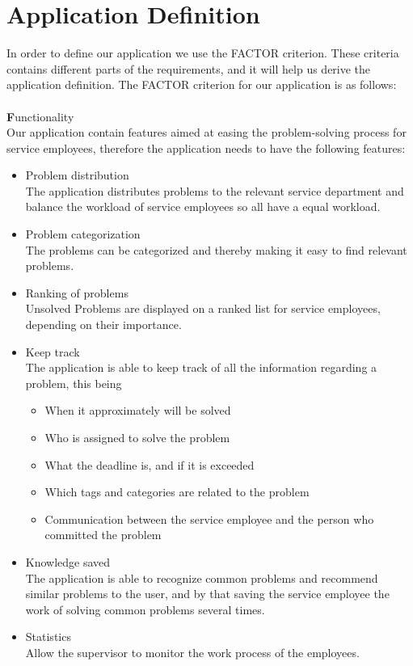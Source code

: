 \section{Application Definition}
\label{sec:factor}
\label{sec:systemdefinition}
In order to define our application we use the FACTOR criterion. \cite[p.~39]{roedeaalborg} These criteria contains different parts of the requirements, and it will help us derive the application definition.
The FACTOR criterion for our application is as follows: \\
\ \\
{\Large \textbf{F}}unctionality \\
Our application contain features aimed at easing the problem-solving process for service employees, therefore the application needs to have the following features:
\begin{itemize}
\item Problem distribution\\
The application distributes problems to the relevant service department and balance the workload of service employees so all have a equal workload. 
\item Problem categorization \\
The problems can be categorized and thereby making it easy to find relevant problems.
\item Ranking of problems \\
Unsolved Problems are displayed on a ranked list for service employees, depending on their importance.
\item Keep track \\
The application is able to keep track of all the information regarding a problem, this being
\begin{itemize}
	\item When it approximately will be solved
	\item Who is assigned to solve the problem
	\item What the deadline is, and if it is exceeded
	\item Which tags and categories are related to the problem 
	\item Communication between the service employee and the person who committed the problem
\end{itemize}
\item Knowledge saved \\
The application is able to recognize common problems and recommend similar problems to the user, and by that saving the service employee the work of solving common problems several times. 
\item Statistics \\
Allow the supervisor to monitor the work process of the employees.
\end{itemize}
